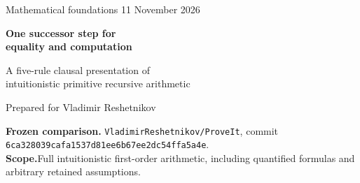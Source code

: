 \documentclass[11pt,letterpaper]{article}
\theoremstyle{definition}
\newcommand{\StepBytes}{2950}
\newcommand{\StepTokens}{829}
\newcommand{\StepAST}{902}
\newcommand{\ControlBytes}{3048}
\newcommand{\ControlTokens}{860}
\newcommand{\ControlAST}{949}
\begin{document}
\begin{titlepage}
\vspace*{1.0cm}
{\large Mathematical foundations \hfill 11 November 2026\par}
\vspace{1.2cm}
{\LARGE\bfseries One successor step for\\[4pt]
equality and computation\par}
\vspace{0.6cm}
{\Large A five-rule clausal presentation of\\
intuitionistic primitive recursive arithmetic\par}
\vspace{0.9cm}
{\large Prepared for Vladimir Reshetnikov\par}
\vspace{1.0cm}
\begin{abstract}
We give a simpler arithmetic inference interface for the current
\texttt{ConciseIPRA} proposal. On its already available zero-normal
iterator syntax, reflexivity and one uniform successor-evaluation rule
derive both computation and arbitrary equational transport. The three
syntactic alternatives of the current computational-equality rule are
replaced by one. The key is an explicit two-step derivation of equality
composition using a one-step identity iterator.

Together with the existing clausal logical interface, the complete
presentation has five primitive rule schemes: Use, Refl, Step, DE, and
DI. Its formulas are only equations and one two-variable binder.
We prove exact consequence equivalence with the native kernel and
therefore whole-domain bi-interpretability and equiconsistency with
full first-order iPRA. Both numerical composites have the identity
graph \(x=y\).

The fully validated standalone Python checker measures
\StepBytes\ normalized bytes, \StepTokens\ significant tokens, and
\StepAST\ AST nodes. A matched zero-normal computation/transport
control measures \ControlBytes, \ControlTokens, and \ControlAST,
respectively. The comparison counts normalization, syntax validation,
scope handling, clause storage, and the command-line interface.
The contribution is a local mathematical and implementation reduction;
no absolute minimum is asserted. The new equivalence is a written
proof supported by executable proof translations and boundary tests,
not a new Lean or Rocq verification.
\end{abstract}
\vfill
\textbf{Frozen comparison.}\quad
\texttt{VladimirReshetnikov/ProveIt}, commit\\
\texttt{6ca328039cafa1537d81ee6b67ee2dc54ffa5a4e}.\\
\textbf{Scope.}\quad Full intuitionistic first-order arithmetic,
including quantified formulas and arbitrary retained assumptions.
\end{titlepage}
\tableofcontents
\clearpage
\end{document}
